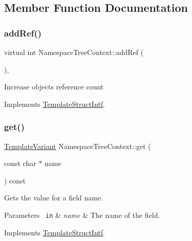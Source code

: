 \subsection{Member Function Documentation}
\mbox{\label{class_namespace_tree_context_a2f77e1fafbf8e6e4245aade3fed316b8}} 
\subsubsection{\texorpdfstring{addRef()}{addRef()}}
{\footnotesize\ttfamily virtual int Namespace\+Tree\+Context\+::add\+Ref (\begin{DoxyParamCaption}{ }\end{DoxyParamCaption})\hspace{0.3cm}{\ttfamily [inline]}, {\ttfamily [virtual]}}

Increase object\textquotesingle{}s reference count 

Implements \mbox{\hyperlink{class_template_struct_intf_a05fe97ad47633beb326f69686faed581}{Template\+Struct\+Intf}}.

\mbox{\label{class_namespace_tree_context_a641364597e056407e75705f4d4693540}} 
\subsubsection{\texorpdfstring{get()}{get()}}
{\footnotesize\ttfamily \mbox{\hyperlink{class_template_variant}{Template\+Variant}} Namespace\+Tree\+Context\+::get (\begin{DoxyParamCaption}\item[{const char $\ast$}]{name }\end{DoxyParamCaption}) const\hspace{0.3cm}{\ttfamily [virtual]}}

Gets the value for a field name. 
\begin{DoxyParams}[1]{Parameters}
\mbox{\texttt{ in}}  & {\em name} & The name of the field. \\
\hline
\end{DoxyParams}


Implements \mbox{\hyperlink{class_template_struct_intf_a3d610cb81b4adbb531ebed3aa3d09b51}{Template\+Struct\+Intf}}.

